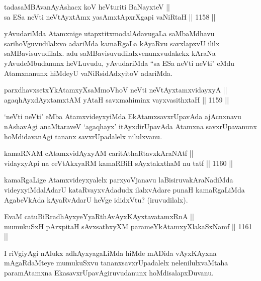\begin{shl}
tadasaMBAvanAyAshacx koV heVturiti BaNayxteV || \\
sa ESa neVti neVtAyxtAmx yasAmxtApxrXgapi vaNiRtaH ||  1158 ||  
\end{shl}

\begin{artha}
yAvudariMda Atamxnige utapxtitxmodalAdavugaLa saMbaMdhavu sarihoVguvudilalxvo adariMda kamaRgaLa kAyaRvu savxlapxvU ililx saMBavisuvudilalx. adu saMBavisuvudilalxvenunxvudakekx kAraNa yAvudeMbudanunx heVLuvudu, yAvudariMda ``sa ESa neVti neVti" eMdu Atamxnanunx hiMdeyU vaNiRsidAdxyitoV adariMda.
\end{artha}

\begin{shl}
parxdhavxsetxYkAtamxyXsaMmoVhoV neVti neVtAyxtamxvidayxyA || \\
agaqhAyxdAyxtamxtAM yAtaH savxmahiminx vayxvasithxtaH ||  1159 ||  
\end{shl}

\begin{artha}
`neVti neVti' eMba AtamxvideyxyiMda EkAtamxsavxrUpavAda ajAcnxnavu nAshavAgi anaMtaraveV `agaqhayx' itAyxdirUpavAda Atamxna savxrUpavanunx hoMdidavanAgi tananx savxrUpadalelx nilulxvanu.
\end{artha}


\begin{shl}
kamaRNAM cA\s \s tamxvidAyxyAM caritAthaRtavxkAraNAtf || \\
vidayxyA\s pi na ceVtAkxyaRM kamaRBiH sAyxtakxthaM nu tatf ||  1160 ||  
\end{shl}

\begin{artha}
kamaRgaLige Atamxvideyxyalelx parxyoVjanavu laBisiruvakAraNadiMda videyxyiMdalAdarU kataRvayxvAdadudx ilalxvAdare punaH kamaRgaLiMda AgabeVkAda kAyaRvAdarU heVge ididxVtu? (iruvudilalx).
\end{artha}

\begin{shl}
EvaM catuBiRradhAyxyeYyaRthAvAyxKAyxtavatamxRnA || \\
mumukuSxH pArxpitaH sAvxsathxyXM parameYkAtamxyXlakaSxNamf ||  1161 ||  
\end{shl}

\begin{artha}
I riVgiyAgi nAlukx adhAyxyagaLiMda hiMde mADida vAyxKAyxna mAgaRdaMteye mumukuSxvu tananxsavxrUpadalelx nelenilulxvaMtaha paramAtamxna EkasavxrUpavAgiruvudanunx hoMdisalapxDuvanu.
\end{artha}

